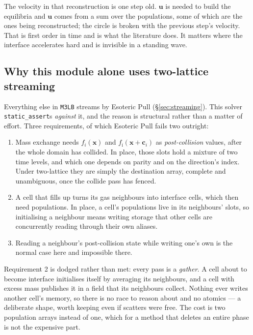 \documentclass[11pt,a4paper]{article}
\newcommand{\code}[1]{\texttt{\small #1}}
\newcommand{\ci}{\bm{c}_i}
\newcommand{\uu}{\bm{u}}
\newcommand{\xx}{\bm{x}}
\begin{document}
The velocity in that reconstruction is one step old. $\uu$ is needed to build
the equilibria and $\uu$ comes from a sum over the populations, some of which
are the ones being reconstructed; the circle is broken with the previous step's
velocity. That is first order in time and is what the literature does. It
matters where the interface accelerates hard and is invisible in a standing
wave.

\subsection{Why this module alone uses two-lattice streaming}
\label{sec:fstwolattice}

Everything else in \code{M3LB} streams by Esoteric Pull (\S\ref{sec:streaming}).
This solver \code{static\_assert}s \emph{against} it, and the reason is
structural rather than a matter of effort. Three requirements, of which Esoteric
Pull fails two outright:

\begin{enumerate}[leftmargin=1.5em,itemsep=2pt]
\item Mass exchange needs $f_i(\xx)$ and $f_{\bar\imath}(\xx+\ci)$ as
  \emph{post-collision} values, after the whole domain has collided. In place,
  those slots hold a mixture of two time levels, and which one depends on parity
  and on the direction's index. Under two-lattice they are simply the
  destination array, complete and unambiguous, once the collide pass has fenced.
\item A cell that fills up turns its gas neighbours into interface cells, which
  then need populations. In place, a cell's populations live in its neighbours'
  slots, so initialising a neighbour means writing storage that other cells are
  concurrently reading through their own aliases.
\item Reading a neighbour's post-collision state while writing one's own is the
  normal case here and impossible there.
\end{enumerate}

Requirement 2 is dodged rather than met: every pass is a \emph{gather}. A cell
about to become interface initialises itself by averaging its neighbours, and a
cell with excess mass publishes it in a field that its neighbours collect.
Nothing ever writes another cell's memory, so there is no race to reason about
and no atomics --- a deliberate shape, worth keeping even if scatters were free.
The cost is two population arrays instead of one, which for a method that
deletes an entire phase is not the expensive part.
\end{document}
